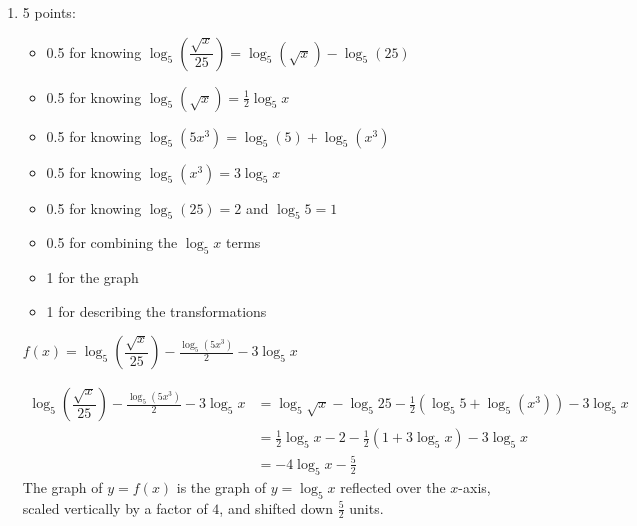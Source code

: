 \documentclass{article}
\begin{document}
\begin{enumerate}
\begin{enumerate}[resume]
  \item

    \begin{grading}
      5 points:
      \begin{itemize}[nosep]
      \item 0.5 for knowing $\log_5 \left( \dfrac{\sqrt{x}}{25} \right) = \log_5 (\sqrt{x}) - \log_5(25)$
      \item 0.5 for knowing $\log_5(\sqrt{x}) = \frac{1}{2} \log_5 x$
      \item 0.5 for knowing $\log_5(5x^3) = \log_5(5) + \log_5 (x^3)$
      \item 0.5 for knowing $\log_5(x^3) = 3 \log_5 x$
      \item 0.5 for knowing $\log_5(25) = 2$ and $\log_5 5 = 1$
      \item 0.5 for combining the $\log_5 x$ terms
      \item 1 for the graph
      \item 1 for describing the transformations
      \end{itemize}
    \end{grading}

    \begin{problem}[\nstretch{1.25}]
      $\displaystyle f(x) = \log_5 \left( \dfrac{\sqrt{x}}{25} \right) - \frac{\log_5 (5x^3)}{2} - 3 \log_5 x$ 
    \end{problem}

    \begin{solution}
      \begin{align*}
        \log_5 \left( \dfrac{\sqrt{x}}{25} \right) - \frac{\log_5 (5x^3)}{2} - 3 \log_5 x 
        &= \log_5 \sqrt{x} - \log_5 25 -\tfrac{1}{2}(\log_5 5 
          + \log_5 (x^3)) - 3 \log_5 x \\
        &= \tfrac{1}{2}\log_5 x - 2 -\tfrac{1}{2}(1 + 3\log_5 x)
          - 3\log_5 x\\
        &= -4\log_5 x -\tfrac{5}{2}
      \end{align*}
      The graph of $y=f(x)$ is the graph of $y=\log_5 x$ reflected
      over the $x$-axis, scaled vertically by a factor of $4$, and
      shifted down $\frac{5}{2}$ units.
      \begin{center}
      \end{center}
    \end{solution}


\end{enumerate}
\end{enumerate}
\end{document}
